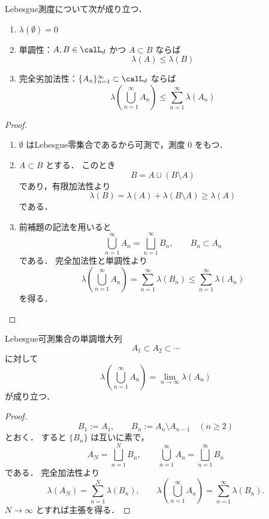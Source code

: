 \begin{theorem}[基本性質]
Lebesgue測度について次が成り立つ．
\begin{enumerate}
    \item $\lambda(\emptyset)=0$
    \item 単調性：$A,B\in\calL_d$ かつ $A\subset B$ ならば
    \[
    \lambda(A)\le \lambda(B)
    \]
    \item 完全劣加法性：$\{A_n\}_{n=1}^{\infty}\subset\calL_d$ ならば
    \[
    \lambda\left(\bigcup_{n=1}^{\infty}A_n\right)
    \le
    \sum_{n=1}^{\infty}\lambda(A_n)
    \]
\end{enumerate}
\end{theorem}
\begin{proof}
\begin{enumerate}
    \item $\emptyset$ はLebesgue零集合であるから可測で，測度 $0$ をもつ．

    \item $A\subset B$ とする．
    このとき
    \[
    B=A\sqcup(B\setminus A)
    \]
    であり，有限加法性より
    \[
    \lambda(B)=\lambda(A)+\lambda(B\setminus A)\ge \lambda(A)
    \]
    である．

    \item 前補題の記法を用いると
    \[
    \bigcup_{n=1}^{\infty}A_n=\bigsqcup_{n=1}^{\infty}B_n,
    \qquad
    B_n\subset A_n
    \]
    である．
    完全加法性と単調性より
    \[
    \lambda\left(\bigcup_{n=1}^{\infty}A_n\right)
    =
    \sum_{n=1}^{\infty}\lambda(B_n)
    \le
    \sum_{n=1}^{\infty}\lambda(A_n)
    \]
    を得る．
\end{enumerate}
\end{proof}

\begin{theorem}[下からの連続性]
Lebesgue可測集合の単調増大列
\[
A_1\subset A_2\subset \cdots
\]
に対して
\[
\lambda\left(\bigcup_{n=1}^{\infty}A_n\right)
=
\lim_{n\to\infty}\lambda(A_n)
\]
が成り立つ．
\end{theorem}
\begin{proof}
\[
B_1:=A_1,\qquad B_n:=A_n\setminus A_{n-1}\quad(n\ge2)
\]
とおく．
すると $\{B_n\}$ は互いに素で，
\[
A_N=\bigsqcup_{n=1}^{N}B_n,\qquad
\bigcup_{n=1}^{\infty}A_n=\bigsqcup_{n=1}^{\infty}B_n
\]
である．
完全加法性より
\[
\lambda(A_N)=\sum_{n=1}^{N}\lambda(B_n),
\qquad
\lambda\left(\bigcup_{n=1}^{\infty}A_n\right)
=
\sum_{n=1}^{\infty}\lambda(B_n).
\]
$N\to\infty$ とすれば主張を得る．
\end{proof}

